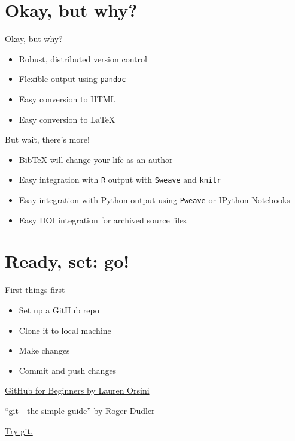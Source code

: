 \section{Okay, but why?}\label{okay-but-why}

\begin{frame}{Okay, but why?}

\begin{itemize}
\itemsep1pt\parskip0pt
\item
  Robust, distributed version control
\item
  Flexible output using \texttt{pandoc}
\item
  Easy conversion to HTML
\item
  Easy conversion to LaTeX
\end{itemize}

\end{frame}

\begin{frame}{But wait, there's more!}

\begin{itemize}
\itemsep1pt\parskip0pt
\item
  BibTeX will change your life as an author
\item
  Easy integration with \texttt{R} output with \texttt{Sweave} and
  \texttt{knitr}
\item
  Esay integration with Python output using \texttt{Pweave} or IPython
  Notebooks
\item
  Easy DOI integration for archived source files
\end{itemize}

\end{frame}

\section{Ready, set: go!}\label{ready-set-go}

\begin{frame}{First things first}

\begin{itemize}
\itemsep1pt\parskip0pt
\item
  Set up a GitHub repo
\item
  Clone it to local machine
\item
  Make changes
\item
  Commit and push changes
\end{itemize}

\href{http://readwrite.com/2013/09/30/understanding-github-a-journey-for-beginners-part-1\#awesm=~oElSkDwiv4MYYT}{GitHub
for Beginners by Lauren Orsini}

\href{http://rogerdudler.github.io/git-guide/}{``git - the simple
guide'' by Roger Dudler}

\href{http://try.github.io/}{Try git.}

\end{frame}

